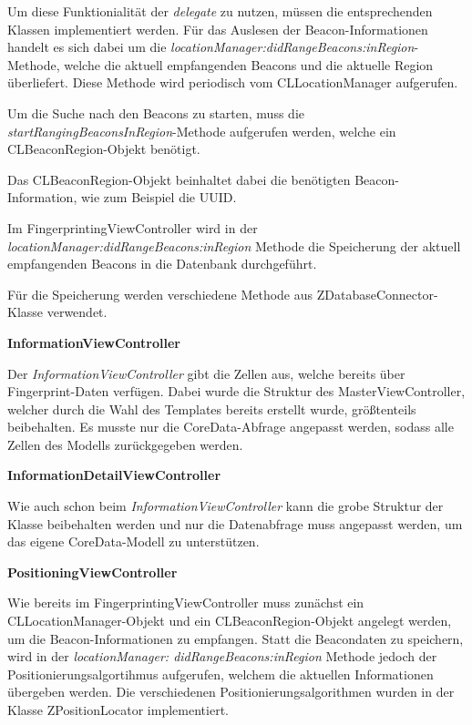 Um diese Funktionialität der \emph{delegate} zu nutzen, müssen die entsprechenden Klassen implementiert werden. Für das Auslesen der Beacon-Informationen handelt es sich dabei um die \emph{locationManager:didRangeBeacons:inRegion}-Methode, welche die aktuell empfangenden Beacons und die aktuelle Region überliefert. Diese Methode wird periodisch vom CLLocationManager aufgerufen.

Um die Suche nach den Beacons zu starten, muss die \emph{startRangingBeaconsInRegion}-Methode aufgerufen werden, welche ein CLBeaconRegion-Objekt benötigt.

Das CLBeaconRegion-Objekt beinhaltet dabei die benötigten Beacon-Information, wie zum Beispiel die UUID.

Im FingerprintingViewController wird in der \emph{locationManager:didRangeBeacons:inRegion} Methode die Speicherung der aktuell empfangenden Beacons in die Datenbank durchgeführt.

Für die Speicherung werden verschiedene Methode aus ZDatabaseConnector-Klasse verwendet.

\textbf{InformationViewController}

Der \emph{InformationViewController} gibt die Zellen aus, welche bereits über Fingerprint-Daten verfügen. Dabei wurde die Struktur des MasterViewController, welcher durch die Wahl des Templates bereits erstellt wurde, größtenteils beibehalten. Es musste nur die CoreData-Abfrage angepasst werden, sodass alle Zellen des Modells zurückgegeben werden.


\textbf{InformationDetailViewController}

Wie auch schon beim \emph{InformationViewController} kann die grobe Struktur der Klasse beibehalten werden und nur die Datenabfrage muss angepasst werden, um das eigene CoreData-Modell zu unterstützen.


\textbf{PositioningViewController}

Wie bereits im FingerprintingViewController muss zunächst ein CLLocationManager-Objekt und ein CLBeaconRegion-Objekt angelegt werden, um die Beacon-Informationen zu empfangen.
Statt die Beacondaten zu speichern, wird in der \emph{locationManager:
\newline didRangeBeacons:inRegion} Methode jedoch der Positionierungsalgortihmus aufgerufen, welchem die aktuellen Informationen übergeben werden. 
Die verschiedenen Positionierungsalgorithmen wurden in der Klasse ZPositionLocator implementiert.


